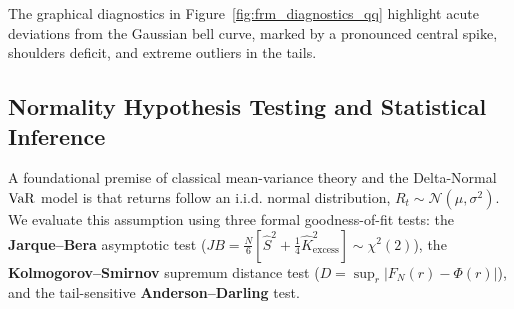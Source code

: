 The graphical diagnostics in Figure~\ref{fig:frm_diagnostics_qq} highlight acute deviations from the Gaussian bell curve, marked by a pronounced central spike, shoulders deficit, and extreme outliers in the tails.

\clearpage

\subsection{Normality Hypothesis Testing and Statistical Inference}

A foundational premise of classical mean-variance theory and the Delta-Normal $\operatorname{VaR}$ model is that returns follow an i.i.d. normal distribution, $R_t \sim \mathcal{N}(\mu, \sigma^2)$. We evaluate this assumption using three formal goodness-of-fit tests: the \textbf{Jarque--Bera} asymptotic test ($JB = \frac{N}{6}[\hat{S}^2 + \frac{1}{4}\hat{K}_{\text{excess}}^2] \sim \chi^2(2)$), the \textbf{Kolmogorov--Smirnov} supremum distance test ($D = \sup_r |F_N(r) - \Phi(r)|$), and the tail-sensitive \textbf{Anderson--Darling} test.

